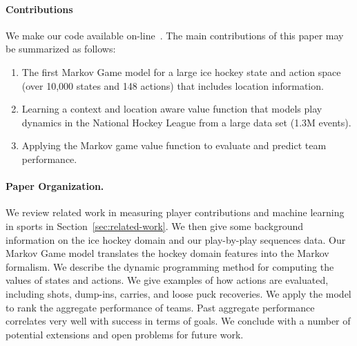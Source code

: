 \paragraph{Contributions}
We make our code available on-line~\citep{bib:sports-site}. The main contributions of this paper may be summarized as follows:

\begin{enumerate}
\item The first Markov Game model for a large ice hockey state and action space (over 10,000 states and 148 actions) that includes location information.
\item Learning a context and location aware value function that models play dynamics in the National Hockey League from a large data set (1.3M events). 
\item Applying the Markov game value function to evaluate and predict team performance.
\end{enumerate}


\paragraph{Paper Organization.}

We review related work in measuring player contributions and machine learning in sports in Section~\ref{sec:related-work}. We then give some background information on the ice hockey domain and our play-by-play sequences data. Our Markov Game model translates the hockey domain features into the Markov formalism. We describe the dynamic programming method for computing the values of states and actions. We give examples of how actions are evaluated, including shots, dump-ins, carries, and loose puck recoveries. We apply the model to rank the aggregate performance of teams. Past aggregate performance correlates very well with success in terms of goals. We conclude with a number of potential extensions and open problems for future work.

